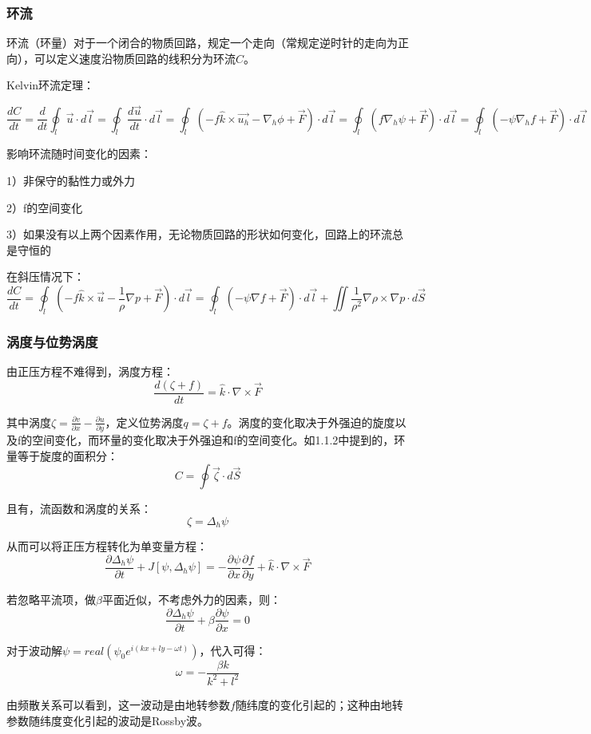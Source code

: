 \documentclass{article}
\begin{document}
\subsubsection{环流}
环流（环量）对于一个闭合的物质回路，规定一个走向（常规定逆时针的走向为正向），可以定义速度沿物质回路的线积分为环流$C$。

Kelvin环流定理：

$$\frac{dC}{dt} = \frac{d}{dt}\oint_l \vec{u}\cdot d\vec{l}=\oint_l \frac{d\vec{u}}{dt}\cdot d\vec{l}=\oint_l (-f\hat{k}\times\vec{u_h}-\nabla_h \phi + \vec{F})\cdot d\vec{l}=\oint_l (f\nabla_h\psi+ \vec{F})\cdot d\vec{l}=\oint_l (-\psi\nabla_hf+ \vec{F})\cdot d\vec{l}$$

影响环流随时间变化的因素：

1）非保守的黏性力或外力

2）f的空间变化

3）如果没有以上两个因素作用，无论物质回路的形状如何变化，回路上的环流总是守恒的

在斜压情况下：
$$\frac{dC}{dt} = \oint_l (-f\hat{k}\times\vec{u}-\frac{1}{\rho}\nabla p +\vec{F})\cdot d\vec{l}=\oint_l (-\psi\nabla f+ \vec{F})\cdot d\vec{l} +  \iint\frac{1}{\rho^2}\nabla\rho\times\nabla p\cdot d\vec{S}$$


\subsubsection{涡度与位势涡度}
由正压方程不难得到，涡度方程：
$$\frac{d(\zeta+f)}{dt}=\hat{k}\cdot\nabla\times\vec{F}$$

其中涡度$\zeta=\frac{\partial v}{\partial x} - \frac{\partial u}{\partial y}$，定义位势涡度$q = \zeta + f$。涡度的变化取决于外强迫的旋度以及f的空间变化，而环量的变化取决于外强迫和f的空间变化。如1.1.2中提到的，环量等于旋度的面积分：
$$C = \oint\vec{\zeta}\cdot d\vec{S}$$

且有，流函数和涡度的关系：
$$\zeta = \Delta_h \psi$$

从而可以将正压方程转化为单变量方程：
$$\frac{\partial\Delta_h\psi}{\partial t} + J[\psi, \Delta_h\psi] = -\frac{\partial\psi}{\partial x}\frac{\partial f}{\partial y}+\hat{k}\cdot\nabla\times\vec{F}$$

若忽略平流项，做$\beta$平面近似，不考虑外力的因素，则：
$$\frac{\partial\Delta_h\psi}{\partial t}+\beta\frac{\partial\psi}{\partial x}=0$$

对于波动解$\psi = real\left(\psi_0e^{i(kx+ly-\omega t)}\right)$，代入可得：
$$\omega = -\frac{\beta k}{k^2+l^2}$$

由频散关系可以看到，这一波动是由地转参数$f$随纬度的变化引起的；这种由地转参数随纬度变化引起的波动是Rossby波。
\end{document}
